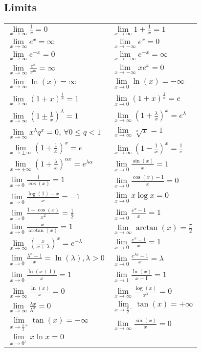 \documentclass[a4paper, 10pt]{article}
\theoremstyle{definition}
\theoremstyle{named}
\begin{document}
\subsection*{Limits}
\newcommand{\limxi}{\lim\limits_{x\to\infty}}
\newcommand{\limxni}{\lim\limits_{x\to-\infty}}
\newcommand{\limx}{\lim\limits_{x\to\pm\infty}}
\newcommand{\limxz}{\lim\limits_{x\to0}}
\renewcommand{\arraystretch}{1.8}
\begin{tabularx}{\linewidth}{XX}
    $\limxi \frac{1}{x} = 0$ & $\limxi 1 + \frac{1}{x} = 1$ \\
    $\limxi e^x = \infty$ & $\limxni e^x = 0$ \\
    $\limxi e^{-x} = 0$ & $\limxni e^{-x} = \infty$ \\
    $\limxi \frac{e^x}{x^m} = \infty$ & $\limxni xe^x = 0$ \\
    $\limxi \ln(x) = \infty$ & $\limxz \ln(x) = -\infty$ \\
    $\limxi (1 + x)^\frac{1}{x} = 1$ & $\limxz (1 + x)^\frac{1}{x} = e$ \\
    $\limxi (1 \pm \frac{1}{x})^\lambda = 1$ & $\limxi (1 + \frac{\lambda}{x})^x = e^\lambda$ \\
    $\limxi x^\lambda q^x = 0$, $\forall 0 \leq q < 1$ & $\limxi \sqrt[x]{x} = 1$ \\
    $\limx (1 + \frac{1}{x})^x = e$ & $\limxi (1 - \frac{1}{x})^x = \frac{1}{e}$ \\
    $\limx (1 + \frac{\lambda}{x})^{\alpha x} = e^{\lambda \alpha}$ & $\limxz \frac{\sin(x)}{x} = 1$ \\
    $\limxz \frac{1}{\cos(x)} = 1$ & $\limxz \frac{\cos(x) - 1}{x} = 0$ \\
    $\limxz \frac{\log(1) - x}{x} = -1$ & $\limxz x \log x = 0$ \\
    $\limxz \frac{1 - \cos(x)}{x^2} = \frac{1}{2}$ & $\limxz \frac{e^x - 1}{x} = 1$ \\
    $\limxz \frac{x}{\arctan(x)} = 1$ & $\limxi \arctan(x) = \frac{\pi}{2}$ \\
    $\limxi (\frac{x}{x + \lambda})^x = e^{-\lambda}$ & $\limxz \frac{e^x - 1}{x} = 1$ \\
    $\limxz \frac{\lambda^x - 1}{x} = \ln(\lambda), \lambda > 0$ & $\limxz \frac{e^{\lambda x} - 1}{x} = \lambda$ \\
    $\limxz \frac{\ln(x+1)}{x} = 1$ & $\lim\limits_{x \to 1} \frac{\ln(x)}{x - 1} = 1$ \\
    $\limxi \frac{\ln(x)}{x} = 0$ & $\limxi \frac{\log(x)}{x^\lambda} = 0$ \\
    $\limxi \frac{\lambda x}{\lambda^x} = 0$ & $\lim\limits_{x \to \frac{\pi}{2}^-} \tan(x) = +\infty$\\
    $\lim\limits_{x \to \frac{\pi}{2}^+} \tan(x) = -\infty$ & $\limxi \frac{\sin(x)}{x} = 0$ \\
    $\lim\limits_{x \to 0^+} x \ln x = 0$
\end{tabularx}
\end{document}
